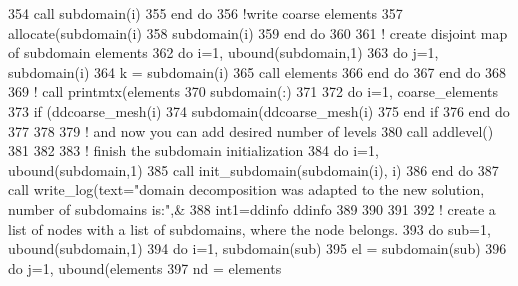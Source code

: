 \begin{DoxyCode}
{{354             \textcolor{keyword}{call }subdomain(i)%
355 \textcolor{keywordflow}{          end do}
356           \textcolor{comment}{!write coarse elements}
357           \textcolor{keyword}{allocate}(subdomain(i)%
358           subdomain(i)%
359 \textcolor{comment}{}\textcolor{keywordflow}{        end do}
360 
361         \textcolor{comment}{! create disjoint map of subdomain elements}
362         \textcolor{keywordflow}{do} i=1, ubound(subdomain,1)
363           \textcolor{keywordflow}{do} j=1, subdomain(i)%
364             k = subdomain(i)%
365             \textcolor{keyword}{call }elements%
366 \textcolor{keywordflow}{          end do}
367 \textcolor{keywordflow}{        end do}
368 
369 \textcolor{comment}{!       call printmtx(elements%
370         subdomain(:)%
371 
372         \textcolor{keywordflow}{do} i=1, coarse_elements%
373           \textcolor{keywordflow}{if} (ddcoarse_mesh(i)%
374             subdomain(ddcoarse_mesh(i)%
375 \textcolor{keywordflow}{          end if}
376 \textcolor{keywordflow}{        end do}
377         
378         
379         \textcolor{comment}{! and now you can add desired number of levels}
380         \textcolor{keyword}{call }addlevel()
381 
382         
383         \textcolor{comment}{! finish the subdomain initialization}
384         \textcolor{keywordflow}{do} i=1, ubound(subdomain,1)
385           \textcolor{keyword}{call }init\_subdomain(subdomain(i), i)
386 \textcolor{keywordflow}{        end do}
387         \textcolor{keyword}{call }write_log(text=\textcolor{stringliteral}{"domain decomposition was adapted to the new solution, number of subdomains
       is:"}\textcolor{comment}{,&}
388 \textcolor{comment}{                        int1=ddinfo%
      ddinfo%
389 \textcolor{comment}{}
390 \textcolor{comment}{}
391 \textcolor{comment}{}
392 \textcolor{comment}{       ! create a list of nodes with a list of subdomains, where the node belongs.}
393         \textcolor{keywordflow}{do} sub=1, ubound(subdomain,1)
394           \textcolor{keywordflow}{do} i=1, subdomain(sub)%
395             el = subdomain(sub)%
396             \textcolor{keywordflow}{do} j=1, ubound(elements%
397               nd = elements%
}}}}
\end{DoxyCode}
